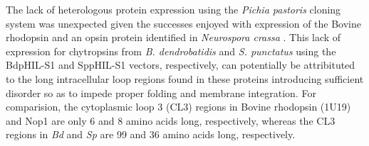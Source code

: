 \indent The lack of heterologous protein expression using the \textit{Pichia pastoris} cloning system was unexpected given the successes enjoyed with expression of the Bovine rhodopsin \cite{Abdulaev1997} and an opsin protein identified in \textit{Neurospora crassa} \cite{Bieszke1999}. This lack of expression for chytropsins from \textit{B. dendrobatidis} and \textit{S. punctatus} using the BdpHIL-S1 and SppHIL-S1 vectors, respectively, can potentially be attribituted to the long intracellular loop regions found in these proteins introducing sufficient disorder so as to impede proper folding and membrane integration. For comparision, the cytoplasmic loop 3 (CL3) regions in Bovine rhodopsin (1U19) and Nop1 are only 6 and 8 amino acids long, respectively, whereas the CL3 regions in \textit{Bd} and \textit{Sp} are 99 and 36 amino acids long, respectively.\\
